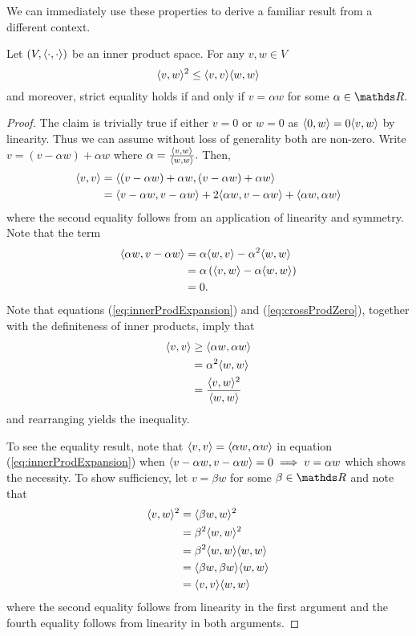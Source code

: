 We can immediately use these properties to derive a familiar result
from a different context.
\begin{prop}
\label{prop:innerCauchySchwarz}Let $\left(V,\langle\cdot,\cdot\rangle\right)$
be an inner product space. For any $v,w\in V$
\[
\langle v,w\rangle{}^{2}\leq\langle v,v\rangle\langle w,w\rangle
\]
and moreover, strict equality holds if and only if $v=\alpha w$ for
some $\alpha\in\R.$
\end{prop}

\begin{proof}
The claim is trivially true if either $v=0$ or $w=0$ as $\langle0,w\rangle=0\langle v,w\rangle$
by linearity. Thus we can assume without loss of generality both are
non-zero. Write $v=\left(v-\alpha w\right)+\alpha w$ where $\alpha=\frac{\langle v,w\rangle}{\langle w,w\rangle}.$
Then,
\begin{align}
\langle v,v\rangle & =\langle\left(v-\alpha w\right)+\alpha w,\left(v-\alpha w\right)+\alpha w\rangle\nonumber \\
 & =\langle v-\alpha w,v-\alpha w\rangle+2\langle\alpha w,v-\alpha w\rangle+\langle\alpha w,\alpha w\rangle\label{eq:innerProdExpansion}
\end{align}
where the second equality follows from an application of linearity
and symmetry. Note that the term
\begin{align}
\langle\alpha w,v-\alpha w\rangle & =\alpha\langle w,v\rangle-\alpha^{2}\langle w,w\rangle\nonumber \\
 & =\alpha\left(\langle v,w\rangle-\alpha\langle w,w\rangle\right)\nonumber \\
 & =0.\label{eq:crossProdZero}
\end{align}
Note that equations (\ref{eq:innerProdExpansion}) and (\ref{eq:crossProdZero}),
together with the definiteness of inner products, imply that 
\begin{align*}
\langle v,v\rangle & \geq\langle\alpha w,\alpha w\rangle\\
 & =\alpha^{2}\langle w,w\rangle\\
 & =\frac{\langle v,w\rangle^{2}}{\langle w,w\rangle}
\end{align*}
and rearranging yields the inequality.

To see the equality result, note that $\langle v,v\rangle=\langle\alpha w,\alpha w\rangle$
in equation (\ref{eq:innerProdExpansion}) when $\langle v-\alpha w,v-\alpha w\rangle=0\implies v=\alpha w$
which shows the necessity. To show sufficiency, let $v=\beta w$ for
some $\beta\in\R$ and note that 
\begin{align*}
\langle v,w\rangle^{2} & =\langle\beta w,w\rangle^{2}\\
 & =\beta^{2}\langle w,w\rangle^{2}\\
 & =\beta^{2}\langle w,w\rangle\langle w,w\rangle\\
 & =\langle\beta w,\beta w\rangle\langle w,w\rangle\\
 & =\langle v,v\rangle\langle w,w\rangle
\end{align*}
where the second equality follows from linearity in the first argument
and the fourth equality follows from linearity in both arguments.
\end{proof}
